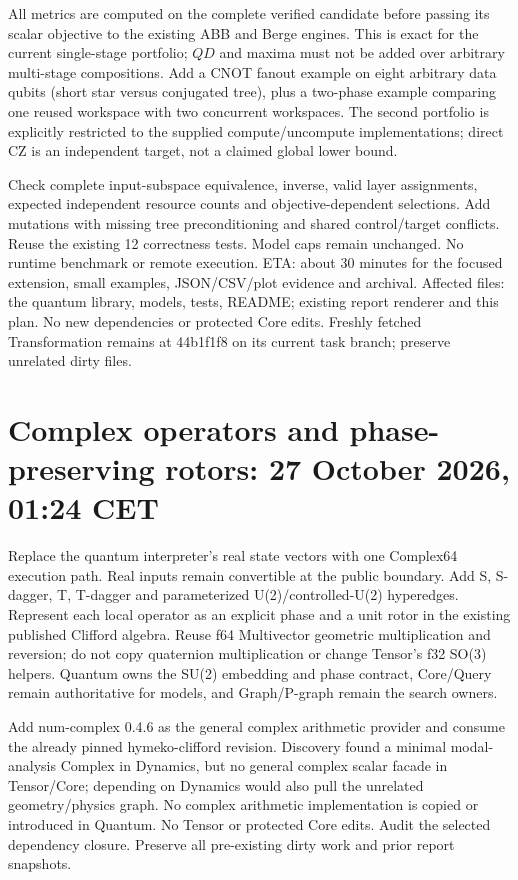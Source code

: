 \documentclass{article}
\begin{document}
All metrics are computed on the complete verified candidate before passing its
scalar objective to the existing ABB and Berge engines. This is exact for the
current single-stage portfolio; $Q D$ and maxima must not be added over arbitrary
multi-stage compositions. Add a CNOT fanout example on eight arbitrary data
qubits (short star versus conjugated tree), plus a two-phase example comparing
one reused workspace with two concurrent workspaces. The second portfolio is
explicitly restricted to the supplied compute/uncompute implementations; direct
CZ is an independent target, not a claimed global lower bound.

Check complete input-subspace equivalence, inverse, valid layer assignments,
expected independent resource counts and objective-dependent selections. Add
mutations with missing tree preconditioning and shared control/target conflicts.
Reuse the existing 12 correctness tests. Model caps remain unchanged. No runtime
benchmark or remote execution. ETA: about 30 minutes for the focused extension,
small examples, JSON/CSV/plot evidence and archival. Affected files: the quantum
library, models, tests, README; existing report renderer and this plan. No new
dependencies or protected Core edits. Freshly fetched Transformation remains
at 44b1f1f8 on its current task branch; preserve unrelated dirty files.
\section*{Complex operators and phase-preserving rotors: 27 October 2026, 01:24 CET}
Replace the quantum interpreter's real state vectors with one Complex64 execution
path. Real inputs remain convertible at the public boundary. Add S, S-dagger, T,
T-dagger and parameterized U(2)/controlled-U(2) hyperedges. Represent each local
operator as an explicit phase and a unit rotor in the existing published
Clifford algebra. Reuse f64 Multivector geometric multiplication and reversion;
do not copy quaternion multiplication or change Tensor's f32 SO(3) helpers.
Quantum owns the SU(2) embedding and phase contract, Core/Query remain authoritative
for models, and Graph/P-graph remain the search owners.

Add num-complex 0.4.6 as the general complex arithmetic provider and consume the
already pinned hymeko-clifford revision. Discovery found a minimal modal-analysis
Complex in Dynamics, but no general complex scalar facade in Tensor/Core;
depending on Dynamics would also pull the unrelated geometry/physics graph.
No complex arithmetic implementation is copied or introduced in Quantum.
No Tensor or protected Core edits. Audit the selected dependency closure. Preserve
all pre-existing dirty work and prior report snapshots.
\end{document}
